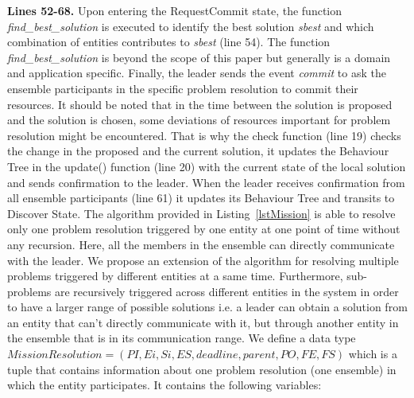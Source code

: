 \documentclass[journal]{IEEEtran}
\theoremstyle{definition}
\begin{document}
\textbf{Lines 52-68.}
Upon entering the RequestCommit state, the function \textit{find\_best\_solution} is executed to identify the best solution \textit{sbest} and which combination of entities contributes to \textit{sbest} (line 54). The function \textit{find\_best\_solution} is beyond the scope of this paper but generally is a domain and application specific. Finally, the leader sends the event \textit{commit} to ask the ensemble participants in the specific problem resolution to commit their resources. 
It should be noted that in the time between the solution is proposed and the solution is chosen, some deviations of resources important for problem resolution might be encountered. That is why the check function (line 19) checks the change in the proposed and the current solution, it updates the Behaviour Tree in the update() function (line 20) with the current state of the local solution and sends confirmation to the leader. When the leader receives confirmation from all ensemble participants (line 61) it updates its Behaviour Tree and transits to Discover State. 
The algorithm provided in Listing~\ref{lstMission} is able to resolve only one problem resolution triggered by one entity at one point of time without any recursion. Here, all the members in the ensemble can directly communicate with the leader. We propose an extension of the algorithm for resolving multiple problems triggered by different entities at a same time. Furthermore, sub-problems are recursively triggered across different entities in the system in order to have a larger range of possible solutions i.e. a leader can obtain a solution from an entity that can't directly communicate with it, but through another entity in the ensemble that is in its communication range. We define a data type  $MissionResolution = (PI, Ei, Si, ES, deadline, parent, PO, FE, FS)$ which is a tuple that contains information about one problem resolution (one ensemble) in which the entity participates.
It contains the following variables:
\end{document}
